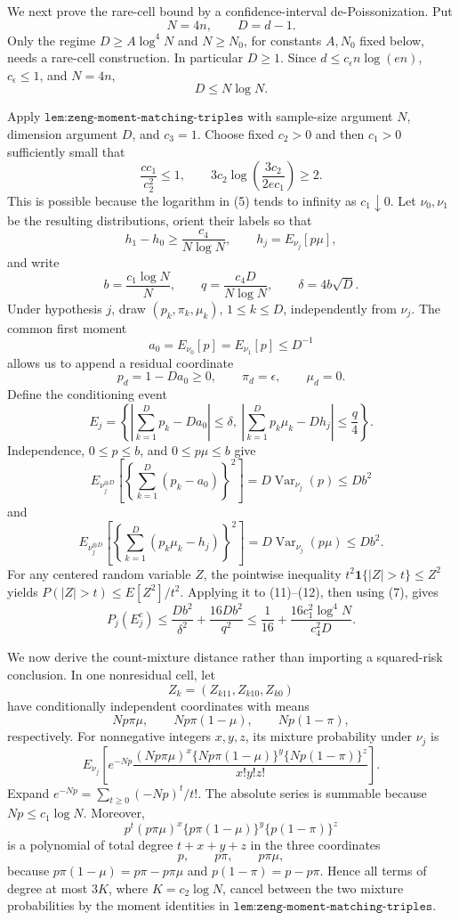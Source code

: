 We next prove the rare-cell bound by a confidence-interval de-Poissonization.  Put
\[
 N=4n,\qquad D=d-1.
\tag{3}
\]
Only the regime \(D\ge A\log^4N\) and \(N\ge N_0\), for constants \(A,N_0\) fixed below, needs a rare-cell construction.  In particular \(D\ge1\).  Since \(d\le c_\epsilon n\log(en)\), \(c_\epsilon\le1\), and \(N=4n\),
\[
 D\le N\log N.
\tag{4}
\]

Apply \(\texttt{lem:zeng-moment-matching-triples}\) with sample-size argument \(N\), dimension argument \(D\), and \(c_3=1\).  Choose fixed \(c_2>0\) and then \(c_1>0\) sufficiently small that
\[
 \frac{cc_1}{c_2^2}\le1,
 \qquad
 3c_2\log\!\left(\frac{3c_2}{2ec_1}\right)\ge2.
\tag{5}
\]
This is possible because the logarithm in (5) tends to infinity as \(c_1\downarrow0\).  Let \(\nu_0,\nu_1\) be the resulting distributions, orient their labels so that
\[
 h_1-h_0\ge \frac{c_4}{N\log N},
 \qquad h_j=E_{\nu_j}[p\mu],
\tag{6}
\]
and write
\[
 b=\frac{c_1\log N}{N},\qquad
 q=\frac{c_4D}{N\log N},\qquad
 \delta=4b\sqrt D.
\tag{7}
\]
Under hypothesis \(j\), draw \((p_k,\pi_k,\mu_k)\), \(1\le k\le D\), independently from \(\nu_j\).  The common first moment
\[
 a_0=E_{\nu_0}[p]=E_{\nu_1}[p]\le D^{-1}
\tag{8}
\]
allows us to append a residual coordinate
\[
 p_d=1-Da_0\ge0,\qquad \pi_d=\epsilon,\qquad \mu_d=0.
\tag{9}
\]
Define the conditioning event
\[
 E_j=
 \left\{\left|\sum_{k=1}^D p_k-Da_0\right|\le\delta,
 \ \left|\sum_{k=1}^D p_k\mu_k-Dh_j\right|\le\frac q4\right\}.
\tag{10}
\]
Independence, \(0\le p\le b\), and \(0\le p\mu\le b\) give
\[
 E_{\nu_j^{\otimes D}}
 \left[\left\{\sum_{k=1}^D(p_k-a_0)\right\}^2\right]
 =D\operatorname{Var}_{\nu_j}(p)\le Db^2
\tag{11}
\]
and
\[
 E_{\nu_j^{\otimes D}}
 \left[\left\{\sum_{k=1}^D(p_k\mu_k-h_j)\right\}^2\right]
 =D\operatorname{Var}_{\nu_j}(p\mu)\le Db^2.
\tag{12}
\]
For any centered random variable \(Z\), the pointwise inequality
\(t^2\mathbf 1\{|Z|>t\}\le Z^2\) yields
\(P(|Z|>t)\le E[Z^2]/t^2\).  Applying it to (11)--(12), then using (7), gives
\[
 P_j(E_j^c)
 \le \frac{Db^2}{\delta^2}
      +\frac{16Db^2}{q^2}
 \le \frac1{16}
      +\frac{16c_1^2\log^4N}{c_4^2D}.
\tag{13}
\]

We now derive the count-mixture distance rather than importing a squared-risk conclusion.  In one nonresidual cell, let
\[
 Z_k=(Z_{k11},Z_{k10},Z_{k0})
\tag{14}
\]
have conditionally independent coordinates with means
\[
 Np\pi\mu,\qquad Np\pi(1-\mu),\qquad Np(1-\pi),
\tag{15}
\]
respectively.  For nonnegative integers \(x,y,z\), its mixture probability under \(\nu_j\) is
\[
 E_{\nu_j}\!\left[
 e^{-Np}
 \frac{(Np\pi\mu)^x\{Np\pi(1-\mu)\}^y\{Np(1-\pi)\}^z}
 {x!y!z!}
 \right].
\tag{16}
\]
Expand \(e^{-Np}=\sum_{t\ge0}(-Np)^t/t!\).  The absolute series is summable because \(Np\le c_1\log N\).  Moreover,
\[
 p^t(p\pi\mu)^x\{p\pi(1-\mu)\}^y\{p(1-\pi)\}^z
\tag{17}
\]
is a polynomial of total degree \(t+x+y+z\) in the three coordinates
\[
 p,\qquad p\pi,\qquad p\pi\mu,
\tag{18}
\]
because \(p\pi(1-\mu)=p\pi-p\pi\mu\) and
\(p(1-\pi)=p-p\pi\).  Hence all terms of degree at most \(3K\), where \(K=c_2\log N\), cancel between the two mixture probabilities by the moment identities in \(\texttt{lem:zeng-moment-matching-triples}\).

